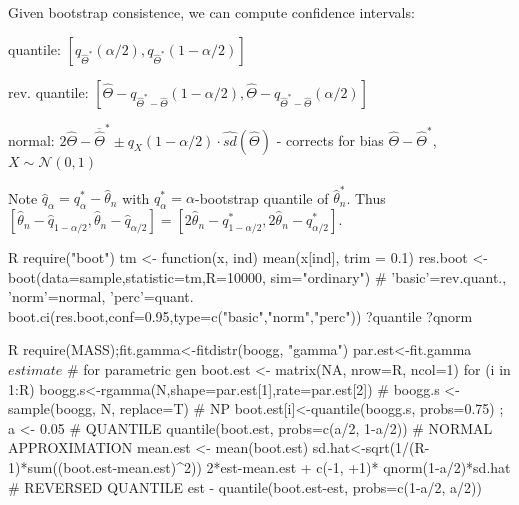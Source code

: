 \begin{sectionbox}\nospacing{}
  Given bootstrap consistence, we can compute confidence intervals: 
  \begin{enumeratenosep}[label=\roman*]
    \item quantile: $ [q_{\hat{\Theta}^{\ast}}(\alpha/2), q_{\hat{\Theta}^{\ast}}(1-\alpha/2)]  $
    \item rev. quantile: $ [\hat{\Theta} - q_{\hat{\Theta}^{\ast}-\hat{\Theta}}(1-\alpha/2), \hat{\Theta} - q_{\hat{\Theta}^{\ast}-\hat{\Theta}}(\alpha/2)]   $
    \item normal: $2\hat{\Theta}-\overline{\hat{\Theta}}^{\ast} \pm q_X(1-\alpha/2)\cdot \hat{sd}(\hat{\Theta})$ - corrects for bias $\hat{\Theta} - \hat{\Theta}^{\ast}$, $X \sim \mathcal{N}(0,1)$ 
  \end{enumeratenosep}
  Note $\hat q_\alpha  = q_\alpha^\ast - \hat \theta_n$ with $q_\alpha^\ast = \alpha$-bootstrap quantile of $\hat\theta_n^\ast$.
  Thus $[\hat\theta_n -\hat q_{1-\alpha/2},\hat \theta_n - \hat q_{\alpha/2}] = [2\hat \theta_n - q_{1-\alpha/2}^\ast, 2\hat\theta_n-q_{\alpha/2}^\ast]$.
\end{sectionbox}
\begin{mintlinebox}{R}
  require("boot")
  tm <- function(x, ind) {mean(x[ind], trim = 0.1)}
  res.boot <- boot(data=sample,statistic=tm,R=10000,
  sim="ordinary")
  # 'basic'=rev.quant., 'norm'=normal, 'perc'=quant.
  boot.ci(res.boot,conf=0.95,type=c("basic","norm","perc"))
  ?quantile ?qnorm
\end{mintlinebox}

\begin{mintlinebox}{R}
  require(MASS);fit.gamma<-fitdistr(boogg, "gamma")
  par.est<-fit.gamma$estimate $ # for parametric gen
  boot.est <- matrix(NA, nrow=R, ncol=1)
  for (i in 1:R) {
    boogg.s<-rgamma(N,shape=par.est[1],rate=par.est[2])
    # boogg.s <- sample(boogg, N, replace=T) # NP
    boot.est[i]<-quantile(boogg.s, probs=0.75)
  }; a <- 0.05
  # QUANTILE
  quantile(boot.est, probs=c(a/2, 1-a/2))
  # NORMAL APPROXIMATION
  mean.est <- mean(boot.est)
  sd.hat<-sqrt(1/(R-1)*sum((boot.est-mean.est)^2))
  2*est-mean.est + c(-1, +1)* qnorm(1-a/2)*sd.hat
  # REVERSED QUANTILE
  est - quantile(boot.est-est, probs=c(1-a/2, a/2))
\end{mintlinebox}


